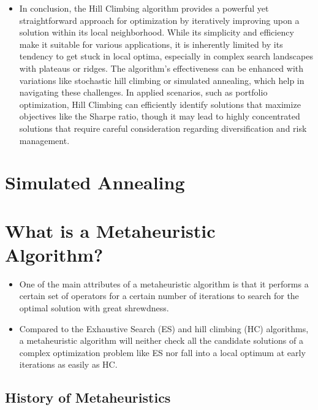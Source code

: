 \documentclass[
  letterpaper,
  DIV=11,
  numbers=noendperiod]{scrreprt}
\providecommand{\tightlist}{%
  \setlength{\itemsep}{0pt}\setlength{\parskip}{0pt}}\usepackage{longtable,booktabs,array}
\begin{document}
\begin{itemize}
\tightlist
\item
  In conclusion, the Hill Climbing algorithm provides a powerful yet
  straightforward approach for optimization by iteratively improving
  upon a solution within its local neighborhood. While its simplicity
  and efficiency make it suitable for various applications, it is
  inherently limited by its tendency to get stuck in local optima,
  especially in complex search landscapes with plateaus or ridges. The
  algorithm's effectiveness can be enhanced with variations like
  stochastic hill climbing or simulated annealing, which help in
  navigating these challenges. In applied scenarios, such as portfolio
  optimization, Hill Climbing can efficiently identify solutions that
  maximize objectives like the Sharpe ratio, though it may lead to
  highly concentrated solutions that require careful consideration
  regarding diversification and risk management.
\end{itemize}


\chapter{Simulated Annealing}\label{simulated-annealing}


\chapter{What is a Metaheuristic
Algorithm?}\label{what-is-a-metaheuristic-algorithm}

\begin{itemize}
\tightlist
\item
  One of the main attributes of a metaheuristic algorithm is that it
  performs a certain set of operators for a certain number of iterations
  to search for the optimal solution with great shrewdness.
\item
  Compared to the Exhaustive Search (ES) and hill climbing (HC)
  algorithms, a metaheuristic algorithm will neither check all the
  candidate solutions of a complex optimization problem like ES nor fall
  into a local optimum at early iterations as easily as HC.
\end{itemize}

\section{History of Metaheuristics}\label{history-of-metaheuristics}
\end{document}
